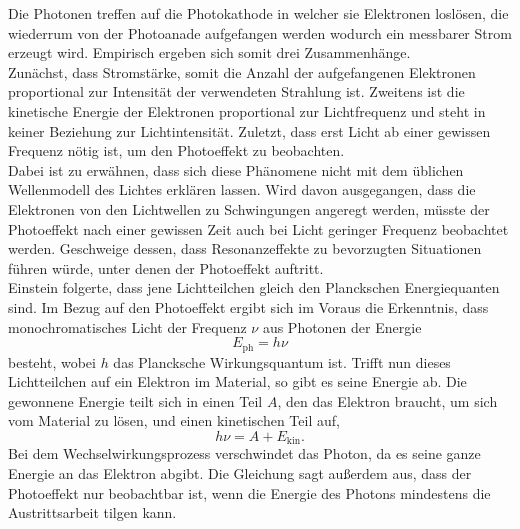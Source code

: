 Die Photonen treffen auf die Photokathode in welcher sie Elektronen loslösen, die wiederrum von der Photoanade aufgefangen werden wodurch ein messbarer Strom erzeugt wird.
Empirisch ergeben sich somit drei Zusammenhänge.\\
Zunächst, dass Stromstärke, somit die Anzahl der aufgefangenen Elektronen proportional zur Intensität der verwendeten Strahlung ist.
Zweitens ist die kinetische Energie der Elektronen proportional zur Lichtfrequenz und steht in keiner Beziehung zur Lichtintensität.
Zuletzt, dass erst Licht ab einer gewissen Frequenz nötig ist, um den Photoeffekt zu beobachten.\\
Dabei ist zu erwähnen, dass sich diese Phänomene nicht mit dem üblichen Wellenmodell des Lichtes erklären lassen.
Wird davon ausgegangen, dass die Elektronen von den Lichtwellen zu Schwingungen angeregt werden, müsste der Photoeffekt nach einer gewissen Zeit auch bei Licht geringer Frequenz beobachtet werden.
Geschweige dessen, dass Resonanzeffekte zu bevorzugten Situationen führen würde, unter denen der Photoeffekt auftritt.\\
Einstein folgerte, dass jene Lichtteilchen gleich den Planckschen Energiequanten sind.
Im Bezug auf den Photoeffekt ergibt sich im Voraus die Erkenntnis, dass monochromatisches Licht der Frequenz $\nu$ aus Photonen der Energie
\begin{equation}
  E_{\text{ph}} = h \nu
\end{equation}
besteht, wobei $h$ das Plancksche Wirkungsquantum ist.
Trifft nun dieses Lichtteilchen auf ein Elektron im Material, so gibt es seine Energie ab.
Die gewonnene Energie teilt sich in einen Teil $A$, den das Elektron braucht, um sich vom Material zu lösen, und einen kinetischen Teil auf,
\begin{equation}
  h \nu = A + E_{\text{kin}}.
\end{equation}
Bei dem Wechselwirkungsprozess verschwindet das Photon, da es seine ganze Energie an das Elektron abgibt.
Die Gleichung sagt außerdem aus, dass der Photoeffekt nur beobachtbar ist, wenn die Energie des Photons mindestens die Austrittsarbeit tilgen kann.


